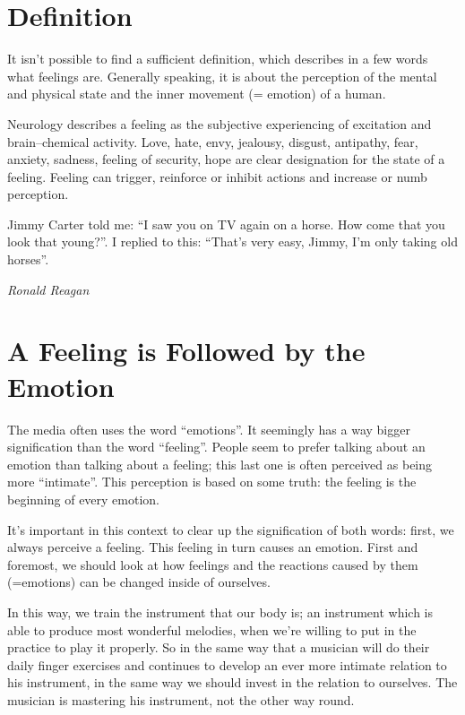 \documentclass[../main.tex]{subfiles}
\begin{document}
\section{Definition}

It isn't possible to find a sufficient definition, which describes in a few words what feelings are.
Generally speaking, it is about the perception of the mental and physical state and the inner movement (= emotion) of a human.

Neurology describes a feeling as the subjective experiencing of excitation and brain--chemical activity.
Love, hate, envy, jealousy, disgust, antipathy, fear, anxiety, sadness, feeling of security, hope are clear designation for the state of a feeling.
Feeling can trigger, reinforce or inhibit actions and increase or numb perception.

\epigraph{Jimmy Carter told me: ``I saw you on TV again on a horse. How come that you look that young?''. I replied to this: ``That's very easy, Jimmy, I'm only taking old horses''.}{\textit{Ronald Reagan}}

\section{A Feeling is Followed by the Emotion}

The media often uses the word ``emotions''.
It seemingly has a way bigger signification than the word ``feeling''.
People seem to prefer talking about an emotion than talking about a feeling; this last one is often perceived as being more ``intimate''.
This perception is based on some truth: the feeling is the beginning of every emotion.

It's important in this context to clear up the signification of both words: first, we always perceive a feeling.
This feeling in turn causes an emotion.
First and foremost, we should look at how feelings and the reactions caused by them (=emotions) can be changed inside of ourselves.

In this way, we train the instrument that our body is;
an instrument which is able to produce most wonderful melodies, when we're willing to put in the practice to play it properly.
So in the same way that a musician will do their daily finger exercises and continues to develop an ever more intimate relation to his instrument,
in the same way we should invest in the relation to ourselves.
The musician is mastering his instrument, not the other way round.
\end{document}

